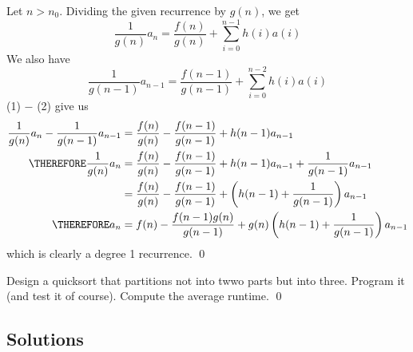 Let $n > n_0$.
Dividing the given recurrence by $g(n)$, we get
\[
  \frac{1}{g(n)} a_n = \frac{f(n)}{g(n)} + \sum_{i=0}^{n-1} h(i) a(i) \tag{1}
\]
We also have
\[
  \frac{1}{g(n-1)} a_{n-1} = \frac{f(n-1)}{g(n-1)} + \sum_{i=0}^{n-2} h(i) a(i) \tag{2}
\]
(1) $-$ (2) give us
\begin{align*}
  \frac{1}{g(n)} a_n - \frac{1}{g(n-1)} a_{n-1}
  &= \frac{f(n)}{g(n)} - \frac{f(n-1)}{g(n-1)} + h(n-1) a_{n-1} \\
  \THEREFORE
  \frac{1}{g(n)} a_n 
  &= \frac{f(n)}{g(n)} - \frac{f(n-1)}{g(n-1)} + h(n-1) a_{n-1} + \frac{1}{g(n-1)} a_{n-1}\\
  &= \frac{f(n)}{g(n)} - \frac{f(n-1)}{g(n-1)} + \left( h(n-1) + \frac{1}{g(n-1)} \right)
  a_{n-1}
  \\
  \THEREFORE
  a_n 
  &= f(n) - \frac{f(n-1)g(n)}{g(n-1)} + g(n)\left( h(n-1) + \frac{1}{g(n-1)} \right)
  a_{n-1}\\
\end{align*}
which is clearly a degree 1 recurrence.
\qed

\newpage
\begin{ex}
  Design a quicksort that partitions not into twwo parts but into three.
  Program it (and test it of course).
  Compute the average runtime.
  \qed
\end{ex}

\newpage
\subsection*{Solutions}
